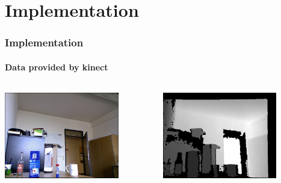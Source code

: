 \documentclass[]{beamer}
\begin{document}


\section{Implementation} %
\label{sg:sec:implementation}

\begin{frame}
    \frametitle{Implementation}
    \framesubtitle{Data provided by kinect}
    \begin{columns}
        \begin{column}{5 cm} 
            \centering
            \includegraphics[width=5cm]{../images/image.jpg}
            
        \end{column}
        \begin{column}{5 cm}
            \centering
            \includegraphics[width=5cm]{../images/depth.jpg}
        \end{column}
    \end{columns}
\end{frame}
\end{document}
